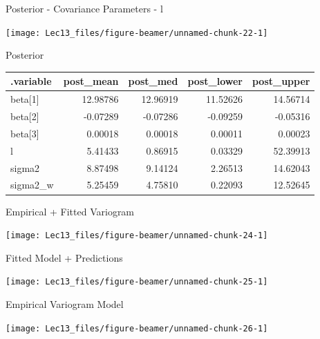 \documentclass[11pt,ignorenonframetext,]{beamer}
\begin{document}
\begin{frame}{Posterior - Covariance Parameters - l}
\protect\hypertarget{posterior---covariance-parameters---l}{}

\begin{center}\texttt{[image: Lec13\_files/figure-beamer/unnamed-chunk-22-1]} \end{center}

\end{frame}

\begin{frame}{Posterior}
\protect\hypertarget{posterior}{}

\begin{longtable}[]{@{}lrrrr@{}}
\toprule
.variable & post\_mean & post\_med & post\_lower &
post\_upper\tabularnewline
\midrule
\endhead
beta{[}1{]} & 12.98786 & 12.96919 & 11.52626 & 14.56714\tabularnewline
beta{[}2{]} & -0.07289 & -0.07286 & -0.09259 & -0.05316\tabularnewline
beta{[}3{]} & 0.00018 & 0.00018 & 0.00011 & 0.00023\tabularnewline
l & 5.41433 & 0.86915 & 0.03329 & 52.39913\tabularnewline
sigma2 & 8.87498 & 9.14124 & 2.26513 & 14.62043\tabularnewline
sigma2\_w & 5.25459 & 4.75810 & 0.22093 & 12.52645\tabularnewline
\bottomrule
\end{longtable}

\end{frame}

\begin{frame}{Empirical + Fitted Variogram}
\protect\hypertarget{empirical-fitted-variogram}{}

\begin{center}\texttt{[image: Lec13\_files/figure-beamer/unnamed-chunk-24-1]} \end{center}

\end{frame}

\begin{frame}{Fitted Model + Predictions}
\protect\hypertarget{fitted-model-predictions}{}

\begin{center}\texttt{[image: Lec13\_files/figure-beamer/unnamed-chunk-25-1]} \end{center}

\end{frame}

\begin{frame}{Empirical Variogram Model}
\protect\hypertarget{empirical-variogram-model}{}

\begin{center}\texttt{[image: Lec13\_files/figure-beamer/unnamed-chunk-26-1]} \end{center}

\end{frame}
\end{document}
